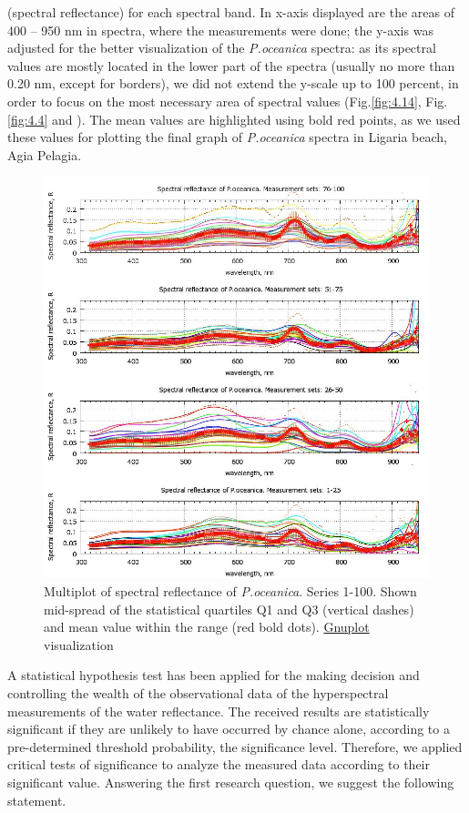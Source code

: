 \documentclass[11pt]{article}
\begin{document}
(spectral reflectance) for each spectral band. In x-axis displayed are the areas of 400 – 950 nm in
spectra, where the measurements were done; the y-axis was adjusted for the better visualization of the
\textit{P.oceanica} spectra: as its spectral values are mostly located in the lower part of the spectra (usually no
more than 0.20 nm, except for borders), we did not extend the y-scale up to 100 percent, in order to
focus on the most necessary area of spectral values (Fig.\ref{fig:4.14}, Fig.\ref{fig:4.4} and ). The mean values are
highlighted using bold red points, as we used these values for plotting the final graph of \textit{P.oceanica} spectra in
Ligaria beach, Agia Pelagia.

\begin{figure}[H]
	\begin{center}
		\includegraphics[scale=0.50]{GNU-13.jpg}
		\caption{Multiplot of spectral reflectance of \textit{P.oceanica}. Series 1-100. Shown mid-spread of the statistical quartiles Q1 and Q3 (vertical dashes) and mean value within the range (red bold dots). \href{http://www.gnuplot.info/}{Gnuplot} visualization­}
		\label{fig:4.13}
	\end{center}
\end{figure}

A statistical hypothesis test has been applied for the making decision and controlling the wealth of the
observational data of the hyperspectral measurements of the water reflectance.
The received results are statistically significant if they are unlikely to have occurred by chance alone,
according to a pre-determined threshold probability, the significance level. Therefore, we applied
critical tests of significance to analyze the measured data according to their significant value.
Answering the first research question, we suggest the following statement.
\end{document}
